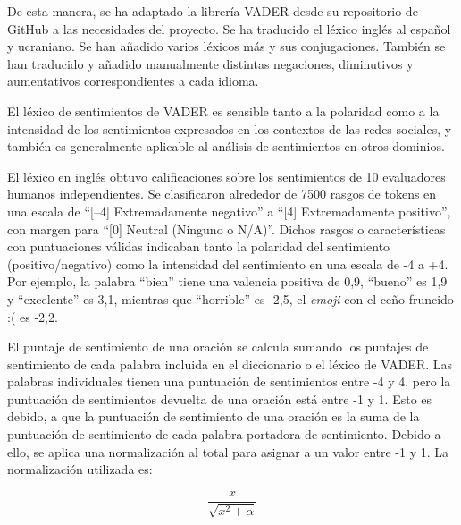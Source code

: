 \vspace{0.3cm}

De esta manera, se ha adaptado la librería \ac{VADER} desde su repositorio de GitHub \cite{vader-manual} a las necesidades del proyecto. Se ha traducido el léxico inglés al español y ucraniano. Se han añadido varios léxicos más y sus conjugaciones. También se han traducido y añadido manualmente distintas negaciones, diminutivos y aumentativos correspondientes a cada idioma. \cite{Saralegi-vader,ukr-vader}

\vspace{0.3cm}

El léxico de sentimientos de \ac{VADER} es sensible tanto a la polaridad como a la intensidad de los sentimientos expresados en los contextos de las redes sociales, y también es generalmente aplicable al análisis de sentimientos en otros dominios.

\vspace{0.3cm}

El léxico en inglés obtuvo calificaciones sobre los sentimientos de 10 evaluadores humanos independientes. Se clasificaron alrededor de 7500 rasgos de tokens en una escala de \enquote{[–4] Extremadamente negativo} a \enquote{[4] Extremadamente positivo}, con margen para \enquote{[0] Neutral (Ninguno o N/A)}. Dichos rasgos o características con puntuaciones válidas indicaban tanto la polaridad del sentimiento (positivo/negativo) como la intensidad del sentimiento en una escala de -4 a +4. Por ejemplo, la palabra \enquote{bien} tiene una valencia positiva de 0,9, \enquote{bueno} es 1,9 y \enquote{excelente} es 3,1, mientras que \enquote{horrible} es -2,5, el \textit{emoji} con el ceño fruncido :( es -2,2. \cite{vader-manual}

\vspace{0.3cm}

El puntaje de sentimiento de una oración se calcula sumando los puntajes de sentimiento de cada palabra incluida en el diccionario o el léxico de \ac{VADER}. Las palabras individuales tienen una puntuación de sentimientos entre -4 y 4, pero la puntuación de sentimientos devuelta de una oración está entre -1 y 1. Esto es debido, a que la puntuación de sentimiento de una oración es la suma de la puntuación de sentimiento de cada palabra portadora de sentimiento. Debido a ello, se aplica una normalización al total para asignar a un valor entre -1 y 1. La normalización utilizada es: \cite{vader-explained}

\begin{equation}
\frac{x}{\sqrt{x^{2}+\alpha}}
\end{equation}

